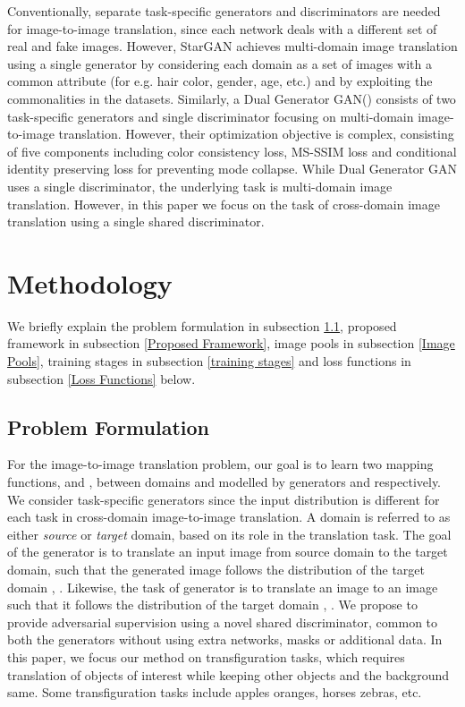 \documentclass[a4paper,twoside]{article}
\begin{document}
Conventionally, separate task-specific generators and discriminators are needed for image-to-image translation, since each network deals with a different set of real and fake images. However, StarGAN \cite{Choi2018CVPRStarGAN} achieves multi-domain image translation using a single generator by considering each domain as a set of images with a common attribute (for e.g. hair color, gender, age, etc.) and by exploiting the commonalities in the datasets. Similarly, a Dual Generator GAN() \cite{Tang2019G2GAN} consists of two task-specific generators and single discriminator focusing on multi-domain image-to-image translation. However, their optimization objective is complex, consisting of five components including color consistency loss, MS-SSIM loss and conditional identity preserving loss for preventing mode collapse. While Dual Generator GAN uses a single discriminator, the underlying task is multi-domain image translation. However, in this paper we focus on the task of cross-domain image translation using a single shared discriminator.
\section{Methodology}
\noindent
We briefly explain the problem formulation in subsection \ref{Problem Formulation}, proposed framework in subsection \ref{Proposed Framework}, image pools in subsection \ref{Image Pools}, training stages in subsection \ref{training stages} and loss functions in subsection \ref{Loss Functions} below.
\subsection{Problem Formulation}
\label{Problem Formulation}
\noindent
For the image-to-image translation problem, our goal is to learn two mapping functions,  and  , between domains  and  modelled by generators  and  respectively. We consider task-specific generators since the input distribution is different for each task in cross-domain image-to-image translation. A domain is referred to as either \textit{source} or \textit{target} domain, based on its role in the translation task. The goal of the generator  is to translate an input image  from source domain  to the target domain, such that the generated image  follows the distribution of the target domain , . Likewise, the task of generator  is to translate an image  to an image  such that it follows the distribution of the target domain , . We propose to provide adversarial supervision using a novel shared discriminator,  common to both the generators without using extra networks, masks or additional data. In this paper, we focus our method on transfiguration tasks, which requires translation of objects of interest while keeping other objects and the background same. Some transfiguration tasks include apples  oranges, horses  zebras, etc.
\end{document}
